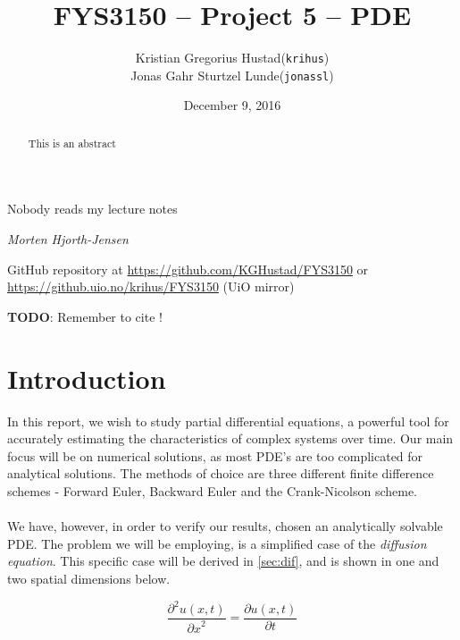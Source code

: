 \documentclass[10pt,a4paper]{article}
\newcommand{\pt}{{\partial t}}
\newcommand{\px}{{\partial x}}
\newcommand{\pu}{{\partial u}}
\newcommand{\ppu}{{\partial^2 u}}
\begin{document}
\title{FYS3150 -- Project 5 -- PDE}
\author{
	\begin{tabular}{rl}
        Kristian Gregorius Hustad & (\texttt{krihus})\\
        Jonas Gahr Sturtzel Lunde & (\texttt{jonassl})
	\end{tabular}}
\date{December 9, 2016}
\maketitle



\setlength{\epigraphwidth}{0.75\textwidth}
\renewcommand{\epigraphflush}{center}
\renewcommand{\beforeepigraphskip}{50pt}
\renewcommand{\afterepigraphskip}{100pt}
\renewcommand{\epigraphsize}{\normalsize}
\epigraph{Nobody reads my lecture notes}
	{\textit{Morten Hjorth-Jensen}}

\begin{abstract}
\noindent
This is an abstract
\end{abstract}

\vfill


\begin{center}
    GitHub repository at \url{https://github.com/KGHustad/FYS3150}
    or \url{https://github.uio.no/krihus/FYS3150} (UiO mirror)
\end{center}


\pagebreak




\textbf{TODO}: Remember to cite \cite{hpl_fdm}!

\section{Introduction}
In this report, we wish to study partial differential equations, a powerful tool for accurately estimating the characteristics of complex systems over time. Our main focus will be on numerical solutions, as most PDE's are too complicated for analytical solutions. The methods of choice are three different finite difference schemes - Forward Euler, Backward Euler and the Crank-Nicolson scheme.
\\\\
We have, however, in order to verify our results, chosen an analytically solvable PDE. The problem we will be employing, is a simplified case of the \textit{diffusion equation}. This specific case will be derived in \vref{sec:dif}, and is shown in one and two spatial dimensions below.

\begin{equation}\label{eqn:PDE}
\frac{\ppu(x,t)}{\px^2} = \frac{\pu(x,t)}{\pt}
\end{equation}
\end{document}
